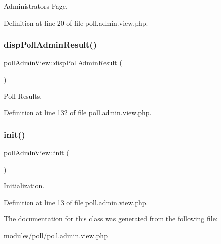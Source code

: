 Administrator\textquotesingle{}s Page. 



Definition at line 20 of file poll.\+admin.\+view.\+php.

\hypertarget{classpollAdminView_ae05b1788a9f40401af695a961137663a}{}\label{classpollAdminView_ae05b1788a9f40401af695a961137663a} 
\subsubsection{\texorpdfstring{disp\+Poll\+Admin\+Result()}{dispPollAdminResult()}}
{\footnotesize\ttfamily poll\+Admin\+View\+::disp\+Poll\+Admin\+Result (\begin{DoxyParamCaption}{ }\end{DoxyParamCaption})}



Poll Results. 



Definition at line 132 of file poll.\+admin.\+view.\+php.

\hypertarget{classpollAdminView_af5d64cefd4797770bd159956c19bb48b}{}\label{classpollAdminView_af5d64cefd4797770bd159956c19bb48b} 
\subsubsection{\texorpdfstring{init()}{init()}}
{\footnotesize\ttfamily poll\+Admin\+View\+::init (\begin{DoxyParamCaption}{ }\end{DoxyParamCaption})}



Initialization. 



Definition at line 13 of file poll.\+admin.\+view.\+php.



The documentation for this class was generated from the following file\+:\begin{DoxyCompactItemize}
\item 
modules/poll/\hyperlink{poll_8admin_8view_8php}{poll.\+admin.\+view.\+php}\end{DoxyCompactItemize}
